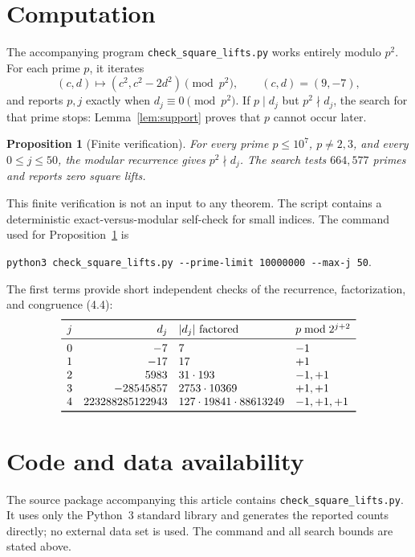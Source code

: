 \documentclass[11pt]{article}
\newtheorem{proposition}[theorem]{Proposition}
\theoremstyle{remark}
\begin{document}
\section{Computation}

The accompanying program \texttt{check\_square\_lifts.py} works entirely
modulo \(p^2\).  For each prime \(p\), it iterates
\[
 (c,d)\longmapsto(c^2,c^2-2d^2)\pmod{p^2},
 \qquad(c,d)=(9,-7),
\]
and reports \(p,j\) exactly when \(d_j\equiv0\pmod{p^2}\).  If
\(p\mid d_j\) but \(p^2\nmid d_j\), the search for that prime stops:
Lemma~\ref{lem:support} proves that \(p\) cannot occur later.

\begin{proposition}[Finite verification]\label{prop:computation}
For every prime \(p\leq10^7\), \(p\neq2,3\), and every
\(0\leq j\leq50\), the modular recurrence gives \(p^2\nmid d_j\).
The search tests \(664{,}577\) primes and reports zero square lifts.
\end{proposition}

This finite verification is not an input to any theorem.  The script
contains a deterministic exact-versus-modular self-check for small
indices.  The command used for Proposition~\ref{prop:computation} is
\begin{center}
\verb|python3 check_square_lifts.py --prime-limit 10000000 --max-j 50|.
\end{center}
The first terms provide short independent checks of the recurrence,
factorization, and congruence (4.4):
\[
\begin{array}{c@{\quad}r@{\quad}l@{\quad}l}
\toprule
j&d_j&|d_j|\text{ factored}&p\bmod 2^{j+2}\\
\midrule
0&-7&7&-1\\
1&-17&17&+1\\
2&5983&31\cdot193&-1,+1\\
3&-28545857&2753\cdot10369&+1,+1\\
4&223288285122943&127\cdot19841\cdot88613249&-1,+1,+1\\
\bottomrule
\end{array}
\]

\section*{Code and data availability}

The source package accompanying this article contains
\texttt{check\_square\_lifts.py}.  It uses only the Python~3 standard
library and generates the reported counts directly; no external data
set is used.  The command and all search bounds are stated above.
\end{document}
